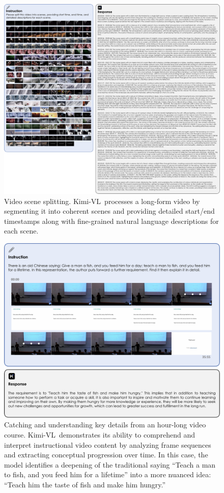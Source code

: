 \documentclass{article}
\newcommand{\ourname}{{Kimi-VL}}
\begin{document}
\begin{figure}[h!]
    \centering
    \includegraphics[width=1.0\linewidth]{figures/case_video_1.pdf}
    \caption{Video scene splitting.
\ourname~processes a long-form video by segmenting it into coherent scenes and providing detailed start/end timestamps along with fine-grained natural language descriptions for each scene.\protect\footnotemark}
    \label{fig:outline}
\end{figure}




\begin{figure}[h!]
    \centering
    \includegraphics[width=1.0\linewidth]{figures/case_video_2.pdf}
    \caption{Catching and understanding key details from an hour-long video course.
\ourname~demonstrates its ability to comprehend and interpret instructional video content by analyzing frame sequences and extracting conceptual progression over time. In this case, the model identifies a deepening of the traditional saying ``Teach a man to fish, and you feed him for a lifetime'' into a more nuanced idea: ``Teach him the taste of fish and make him hungry.''\protect\footnotemark}
    \label{fig:outline}
\end{figure}
\end{document}
